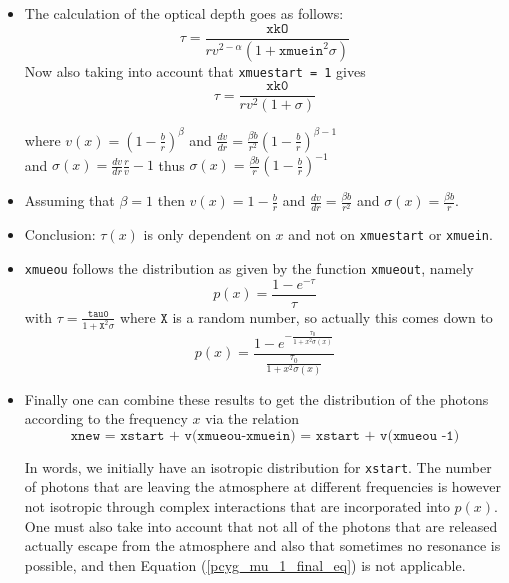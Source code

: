\documentclass[../main/main.tex]{subfiles}
\begin{document}
\begin{itemize}
\item The calculation of the optical depth goes as follows:
\begin{equation}
\tau = \frac{\texttt{xkO}}{rv^{2-\alpha}(1+\texttt{xmuein}^2 \sigma)}
\end{equation}
Now also taking into account that \texttt{xmuestart = 1} gives
\begin{equation}
\tau = \frac{\texttt{xk0}}{rv^2(1+\sigma)}
\end{equation}

where $\boxed{v(x) = \left(1 - \frac{b}{r} \right)^{\beta}}$ 
\quad and $\frac{dv}{dr} = \frac{\beta b}{r^2}\left( 1 - \frac{b}{r} \right)^{\beta - 1}$  \\
and $\sigma(x) = \frac{dv}{dr}\frac{r}{v}-1$ 
thus $\boxed{\sigma(x) = \frac{\beta b}{r}\left( 1-\frac{b}{r}\right)^{-1}}$

\item Assuming that $\beta = 1$ then $\boxed{v(x) = 1 - \frac{b}{r}}$ and $\frac{dv}{dr} = \frac{\beta b}{r^2}$ and $\boxed{\sigma(x) = \frac{\beta b}{r}}$.

\item Conclusion: $\tau(x)$ is only dependent on $x$ and not on \texttt{xmuestart} or \texttt{xmuein}.

\item \texttt{xmueou} follows the distribution as given by the function \texttt{xmueout}, namely
\begin{equation}
p(x) = \frac{1-e^{-\tau}}{\tau}
\end{equation}
with $\tau = \frac{\texttt{tau0}}{1+\texttt{X}^2 \sigma}$ where $\texttt{X}$ is a random number, so actually this comes down to
\begin{equation}
\boxed{p(x) = \frac{1-e^{-\frac{\tau_0}{1+x^2\sigma(x)}}}{\frac{\tau_0}{1+x^ 2\sigma(x)}}}
\end{equation}

\item Finally one can combine these results to get the distribution of the photons according to the frequency $x$ via the relation 
\begin{equation}
\texttt{xnew = xstart + v(xmueou-xmuein) = xstart + v(xmueou -1)}
\label{pcyg_mu_1_final_eq}
\end{equation}

In words, we initially have an isotropic distribution for \texttt{xstart}. The number of photons that are leaving the atmosphere at different frequencies is however not isotropic through complex interactions that are incorporated into $p(x)$.
One must also take into account that not all of the photons that are released actually escape from the atmosphere and also that sometimes no resonance is possible, and then Equation (\ref{pcyg_mu_1_final_eq}) is not applicable.

\end{itemize}
\end{document}
